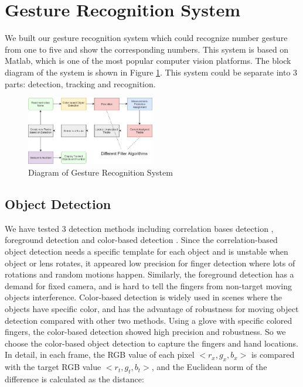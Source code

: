 \documentclass[10pt,twocolumn,letterpaper]{article}
\begin{document}
\section{Gesture Recognition System}

We built our gesture recognition system which could recognize number gesture from one to five and show the corresponding numbers. This system is based on Matlab, which is one of the most popular computer vision platforms. The block diagram of the system is shown in Figure \ref{fig: system diagram}. This system could be separate into 3 parts: detection, tracking and recognition.

\begin{figure}[h]
     \centering
       \includegraphics[width=0.5\textwidth]{duchen_1.png}
         \caption{\small{Diagram of Gesture Recognition System}}
         \label{fig: system diagram}
 \end{figure}

\subsection{Object Detection}

We have tested 3 detection methods including correlation bases detection \cite{ref:kernel}, foreground detection \cite{ref:gallego2009} and color-based detection \cite{ref:khan2001object}. Since the correlation-based object detection needs a specific template for each object and is unstable when object or lens rotates, it appeared low precision for finger detection where lots of rotations and random motions happen. Similarly, the foreground detection has a demand for fixed camera, and is hard to tell the fingers from non-target moving objects interference. Color-based detection is widely used in scenes where the objects have specific color, and has the advantage of robustness for moving object detection compared with other two methods. Using a glove with specific colored fingers, the color-based detection showed high precision and robustness. So we choose the color-based object detection to capture the fingers and hand locations. In detail, in each frame, the RGB value of each pixel $<r_x, g_x, b_x>$ is compared with the target RGB value $<r_t, g_t, b_t>$, and the Euclidean norm of the difference is calculated as the distance:
\end{document}
